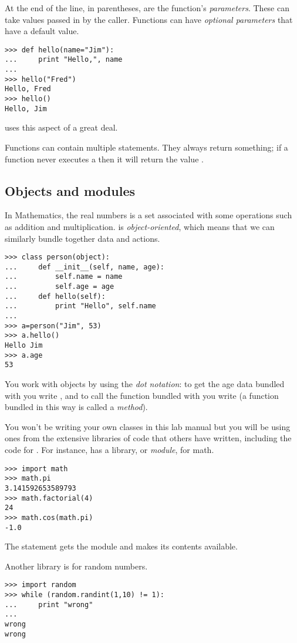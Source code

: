 At the end of the  line, in parentheses, are
the function's \textit{parameters}. 
These can take values 
passed in by the caller.
Functions can have \textit{optional parameters} that have a default value.
\begin{lstlisting}[style=python]
>>> def hello(name="Jim"):
...     print "Hello,", name
... 
>>> hello("Fred")
Hello, Fred
>>> hello()
Hello, Jim  
\end{lstlisting}
\Sage{} uses this aspect of \python{} a great deal.

Functions can contain multiple  statements.
They always return something; 
if a function never executes a  then it will
return the value .




\subsection{Objects and modules}
In Mathematics, the real numbers is a set associated with some operations
such as addition and multiplication.
\python{} is \textit{object-oriented}, which means that we can similarly bundle
together data and actions.
\begin{lstlisting}[style=python]
>>> class person(object):
...     def __init__(self, name, age):
...         self.name = name
...         self.age = age
...     def hello(self):
...         print "Hello", self.name
... 
>>> a=person("Jim", 53)
>>> a.hello()
Hello Jim
>>> a.age
53  
\end{lstlisting}
You work with objects by using the \textit{dot notation}:
to get the age data bundled with 
you write , and to 
call the  function bundled
with  you write
(a function bundled in this way is called a \textit{method}).

You won't be writing your own classes in this lab manual 
but you will be using ones from
the extensive libraries of code that others have written, including the
code for \Sage. 
For instance, \python{} has a library, or \textit{module}, for math.
\begin{lstlisting}[style=python]
>>> import math
>>> math.pi
3.141592653589793
>>> math.factorial(4)
24
>>> math.cos(math.pi)
-1.0
\end{lstlisting}
The  statement gets the module and makes
its contents available.

Another library is for random numbers.
\begin{lstlisting}[style=python]
>>> import random
>>> while (random.randint(1,10) != 1):
...     print "wrong"
... 
wrong
wrong
\end{lstlisting}



